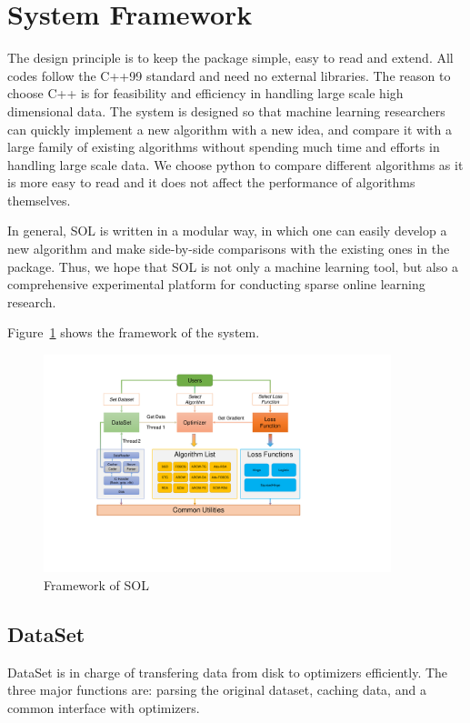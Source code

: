 \documentclass[11pt,a4paper]{article}
\begin{document}
\section{System Framework}

The design principle is to keep the package simple, easy to read and extend.
All codes follow the C++99 standard and need no external libraries. The reason
to choose C++ is for feasibility and efficiency in handling large scale high
dimensional data. The system is designed so that machine learning researchers
can quickly implement a new algorithm with a new idea, and compare it with a
large family of existing algorithms without spending much time and efforts in
handling large scale data. We choose python to compare different algorithms as
it is more easy to read and it does not affect the performance of algorithms
themselves.

In general, SOL is written in a modular way, in which one can easily develop a
new algorithm and make side-by-side comparisons with the existing ones in the
package. Thus, we hope that SOL is not only a machine learning tool, but also a
comprehensive experimental platform for conducting sparse online learning research.

Figure~\ref{fig:framework} shows the framework of the system.
\begin{figure}[!ht]
    \centering
    \includegraphics[width=0.9\textwidth]{figs/framework.pdf}
    \caption{Framework of SOL}
    \label{fig:framework}
\end{figure}

\subsection{DataSet}

DataSet is in charge of transfering data from disk to optimizers efficiently. The three major functions are: parsing the original dataset, caching data, and a common interface with optimizers.
\end{document}
